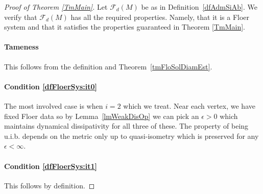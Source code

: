 \documentclass[11pt]{amsart}
\theoremstyle{definition}
\theoremstyle{remark}
\begin{document}
\begin{proof}[Proof of Theorem \ref{TmMain}]
Let $\mathcal{F}_d(M)$ be as in Definition~\ref{dfAdmSiAb}. We verify that $\mathcal{F}_d(M)$ has all the required properties. Namely, that it is a Floer system and that it satisfies the properties guaranteed in Theorem \ref{TmMain}.
\paragraph{\textbf{Tameness}}
This follows from the definition and Theorem~\ref{tmFloSolDiamEst}.

\paragraph{\textbf{Condition \ref{dfFloerSys:it0}}}The most involved case is when $i=2$ which we treat. Near each vertex, we have fixed Floer data so by Lemma~\ref{lmWeakDisOp} we can pick an $\epsilon>0$ which maintains dynamical dissipativity for all three of these.  The property of being u.i.b. depends on the metric only up to quasi-isometry which is preserved for any $\epsilon<\infty$.
\paragraph{\textbf{Condition \ref{dfFloerSys:it1}}} This follows by definition.

\end{proof}
\end{document}
